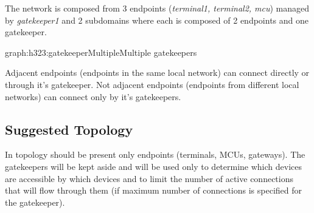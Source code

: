 \documentclass[a4paper]{report}
\begin{document}
The network is composed from 3 endpoints (\emph{terminal1, terminal2, mcu}) managed by \emph{gatekeeper1} and 2 subdomains where each is composed of 2 endpoints and one gatekeeper.%
\begin{Graph}{graph:h323:gatekeeperMultiple}{Multiple gatekeepers}{}
  

     
  

\end{Graph}%
Adjacent endpoints (endpoints in the same local network) can connect directly or through it's gatekeeper. Not adjacent endpoints (endpoints from different local networks) can connect only by it's gatekeepers.

\subsection{Suggested Topology}
In topology should be present only endpoints (terminals, MCUs, gateways). The gatekeepers will be kept aside and will be used only to determine which devices are accessible by which devices and to limit the number of active connections that will flow through them (if maximum number of connections is specified for the gatekeeper).
\end{document}
